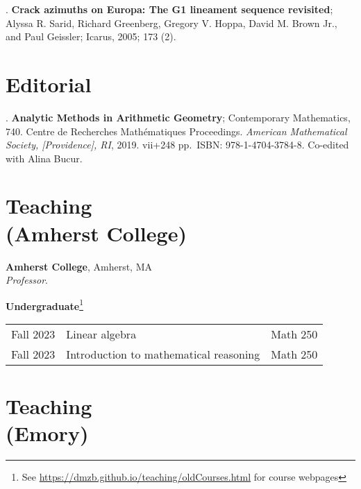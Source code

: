 \documentclass[margin,line]{res}
\newcounter{pubs}
\newcommand{\defi}[1]{\textsf{#1}} 				%
\begin{document}
\begin{resume}
 .  \textbf{Crack azimuths on Europa: The G1 lineament sequence revisited}; Alyssa R. Sarid, Richard Greenberg, Gregory V. Hoppa, David M. Brown Jr., and Paul Geissler; Icarus, 2005; 173 (2). \vspace{.08cm}\\ 


\section{\sc Editorial}


 .  \textbf{Analytic Methods in Arithmetic Geometry}; Contemporary
Mathematics, 740. Centre de Recherches Math\'ematiques Proceedings. \emph{American Mathematical Society, [Providence], RI}, 2019. vii+248 pp.~ISBN: 978-1-4704-3784-8. Co-edited with Alina Bucur. \vspace{.08cm}\\ 


\newpage
\vspace{-7pt}
\section{\sc Teaching \\ (Amherst College)}

{\bf Amherst College}, Amherst, MA\\
\emph{Professor}. 
\vspace{2pt}




{\bf Undergraduate}\footnote{See \url{https://dmzb.github.io/teaching/oldCourses.html} for course webpages}
\vspace*{-.1in}

\begin{tabular}{rll}
 Fall 2023 & \defi{Linear algebra} & Math 250\\  
 Fall 2023 & \defi{Introduction to mathematical reasoning} & Math 250\\  
\end{tabular}

\vspace{-7pt}
\section{\sc Teaching \\ (Emory)}


\end{resume}
\end{document}
